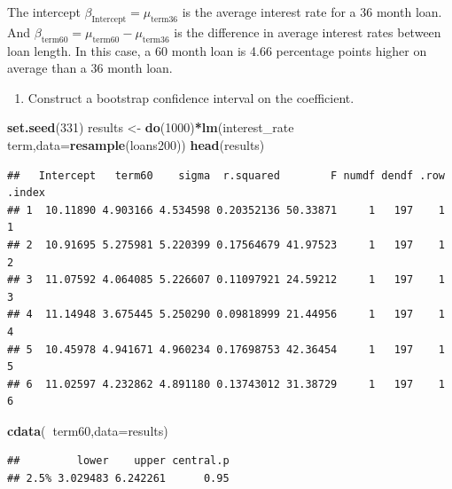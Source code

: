 \documentclass[
]{book}
\newenvironment{Shaded}{\begin{snugshade}}{\end{snugshade}}
\newcommand{\DataTypeTok}[1]{\textcolor[rgb]{0.13,0.29,0.53}{#1}}
\newcommand{\DecValTok}[1]{\textcolor[rgb]{0.00,0.00,0.81}{#1}}
\newcommand{\KeywordTok}[1]{\textcolor[rgb]{0.13,0.29,0.53}{\textbf{#1}}}
\newcommand{\NormalTok}[1]{#1}
\newcommand{\OperatorTok}[1]{\textcolor[rgb]{0.81,0.36,0.00}{\textbf{#1}}}
\newcommand{\StringTok}[1]{\textcolor[rgb]{0.31,0.60,0.02}{#1}}
\providecommand{\tightlist}{%
  \setlength{\itemsep}{0pt}\setlength{\parskip}{0pt}}
\begin{document}
The intercept \(\beta_\text{Intercept} = \mu_\text{term36}\) is the average interest rate for a 36 month loan. And \(\beta_\text{term60} = \mu_\text{term60} - \mu_\text{term36}\) is the difference in average interest rates between loan length. In this case, a 60 month loan is 4.66 percentage points higher on average than a 36 month loan.

\begin{enumerate}
\def\labelenumi{\alph{enumi}.}
\setcounter{enumi}{3}
\tightlist
\item
  Construct a bootstrap confidence interval on the coefficient.
\end{enumerate}

\begin{Shaded}
\begin{Highlighting}[]
\KeywordTok{set.seed}\NormalTok{(}\DecValTok{331}\NormalTok{)}
\NormalTok{results <-}\StringTok{ }\KeywordTok{do}\NormalTok{(}\DecValTok{1000}\NormalTok{)}\OperatorTok{*}\KeywordTok{lm}\NormalTok{(interest_rate }\OperatorTok{~}\StringTok{ }\NormalTok{term,}\DataTypeTok{data=}\KeywordTok{resample}\NormalTok{(loans200))}
\KeywordTok{head}\NormalTok{(results)}
\end{Highlighting}
\end{Shaded}

\begin{verbatim}
##   Intercept   term60    sigma  r.squared        F numdf dendf .row .index
## 1  10.11890 4.903166 4.534598 0.20352136 50.33871     1   197    1      1
## 2  10.91695 5.275981 5.220399 0.17564679 41.97523     1   197    1      2
## 3  11.07592 4.064085 5.226607 0.11097921 24.59212     1   197    1      3
## 4  11.14948 3.675445 5.250290 0.09818999 21.44956     1   197    1      4
## 5  10.45978 4.941671 4.960234 0.17698753 42.36454     1   197    1      5
## 6  11.02597 4.232862 4.891180 0.13743012 31.38729     1   197    1      6
\end{verbatim}

\begin{Shaded}
\begin{Highlighting}[]
\KeywordTok{cdata}\NormalTok{(}\OperatorTok{~}\NormalTok{term60,}\DataTypeTok{data=}\NormalTok{results)}
\end{Highlighting}
\end{Shaded}

\begin{verbatim}
##         lower    upper central.p
## 2.5% 3.029483 6.242261      0.95
\end{verbatim}
\end{document}
